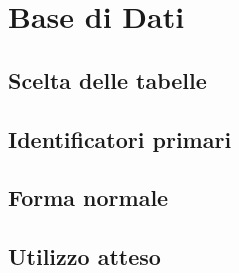 \section{Base di Dati}
    \subsection{Scelta delle tabelle}
    \subsection{Identificatori primari}
    \subsection{Forma normale}
    \subsection{Utilizzo atteso}

    